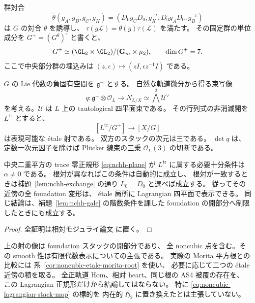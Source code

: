 \begin{proposition}
\label{prop:noncubic-lagrangian-etale-slice}
群対合
\begin{equation}\label{eq:noncubic-group-involution}
 \widetilde\theta(g_A,g_B,g_C,g_K)
 =(D_0g_CD_0,g_K^{-t},D_0g_AD_0,g_B^{-t})
\end{equation}
は $G$ の対合 $\theta$ を誘導し、
$\tau(g\mathscr L)=\theta(g)\tau(\mathscr L)$ を満たす。
その固定群の単位成分を $G^+=(G^\theta)^\circ$ と書くと、
\[
 G^+\simeq
 (\GL_2\times\GL_2)/(\mathbf G_m\times\mu_2),
 \qquad \dim G^+=7.
\]
ここで中央部分群の埋込みは
$(z,\epsilon)\mapsto(zI,\epsilon z^{-1}I)$ である。

$G$ の Lie 代数の負固有空間を $\mathfrak g^-$ とする。
自然な軌道微分から得る束写像
\begin{equation}\label{eq:noncubic-normal-orbit-map}
 q:\mathfrak g^-\otimes\mathcal O_L
   \longrightarrow N_{L/X}
   \simeq\bigwedge^2\mathscr U^\vee
\end{equation}
を考える。$\mathscr U$ は $L$ 上の tautological 四平面束である。
その行列式の非消滅開を $L^{\mathrm{tr}}$ とすると、
\[
 [L^{\mathrm{tr}}/G^+]\longrightarrow[X/G]
 \tag{LG-slice}\label{eq:noncubic-lagrangian-stack-map}
\]
は表現可能な \texorpdfstring{\'etale}{etale} 射である。
双方のスタックの次元は三である。
$\det q$ は、定数一次元因子を除けば
Pl\"ucker 線束の三乗 $\mathcal O_L(3)$ の切断である。

中央二重平方の trace 零正規形
\eqref{eq:nchh-plane} が $L^{\mathrm{tr}}$ に属する必要十分条件は
$\alpha\ne0$ である。
根対が異なればこの条件は自動的に成立し、
根対が一致するときは補題~\ref{lem:nchh-exchange} の通り
$L_0=D_0$ と選べば成立する。
従ってその近傍の全 foundation 変形は、
\texorpdfstring{\'etale}{etale} 局所に Lagrangian 四平面で表示できる。
同じ結論は、補題~\ref{lem:nchh-gale} の階数条件を課した
foundation の開部分へ制限したときにも成立する。
\end{proposition}

\begin{proof}
全証明は相対モジュライ論文 \cite[\texttt{noncubic_hh_roots}]{QuadricModuli2026} に置く。
\end{proof}

\begin{remark}[この表示が与えるもの]
\label{rem:noncubic-lagrangian-scope}
上の射の像は foundation スタックの開部分であり、
全 noncubic 点を含む。その smooth 性は有限代数表示についての主張である。
実際の Morita 平方根との比較には
系~\ref{cor:noncubic-etale-morita-root} を使い、
必要に応じて二つの \texorpdfstring{\'etale}{etale} 近傍の積を取る。
全正軌道 Hom、相対 heart、同じ根の AS4 被覆の存在を、
この Lagrangian 正規形だけから結論してはならない。
特に \eqref{eq:noncubic-lagrangian-stack-map} の標的を
内在的 $\mathfrak H_2$ に置き換えたとは主張していない。
\end{remark}


